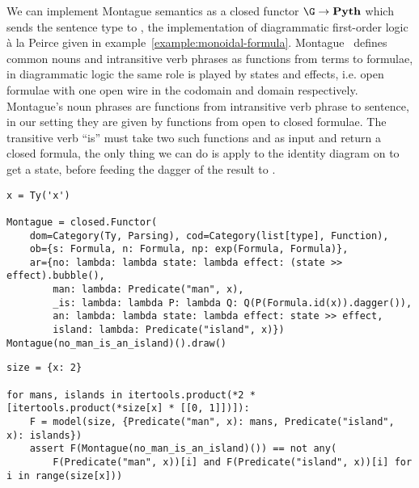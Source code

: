 \begin{example}
We can implement Montague semantics as a closed functor $\G \to \mathbf{Pyth}$ which sends the sentence type to , the implementation of diagrammatic first-order logic à la Peirce given in example~\ref{example:monoidal-formula}.
Montague~\cite{Montague73} defines common nouns and intransitive verb phrases as functions from terms to formulae, in diagrammatic logic the same role is played by states and effects, i.e. open formulae with one open wire  in the codomain and domain respectively.
Montague's noun phrases are functions from intransitive verb phrase to sentence, in our setting they are given by functions from open to closed formulae.
The transitive verb ``is'' must take two such functions  and  as input and return a closed formula, the only thing we can do is apply  to the identity diagram on  to get a state, before feeding the dagger of the result to .

\begin{verbatim}
x = Ty('x')

Montague = closed.Functor(
    dom=Category(Ty, Parsing), cod=Category(list[type], Function),
    ob={s: Formula, n: Formula, np: exp(Formula, Formula)},
    ar={no: lambda: lambda state: lambda effect: (state >> effect).bubble(),
        man: lambda: Predicate("man", x),
        _is: lambda: lambda P: lambda Q: Q(P(Formula.id(x)).dagger()),
        an: lambda: lambda state: lambda effect: state >> effect,
        island: lambda: Predicate("island", x)})
Montague(no_man_is_an_island)().draw()
\end{verbatim}


\begin{verbatim}
size = {x: 2}

for mans, islands in itertools.product(*2 * [itertools.product(*size[x] * [[0, 1]])]):
    F = model(size, {Predicate("man", x): mans, Predicate("island", x): islands})
    assert F(Montague(no_man_is_an_island)()) == not any(
        F(Predicate("man", x))[i] and F(Predicate("island", x))[i] for i in range(size[x]))
\end{verbatim}
\end{example}

